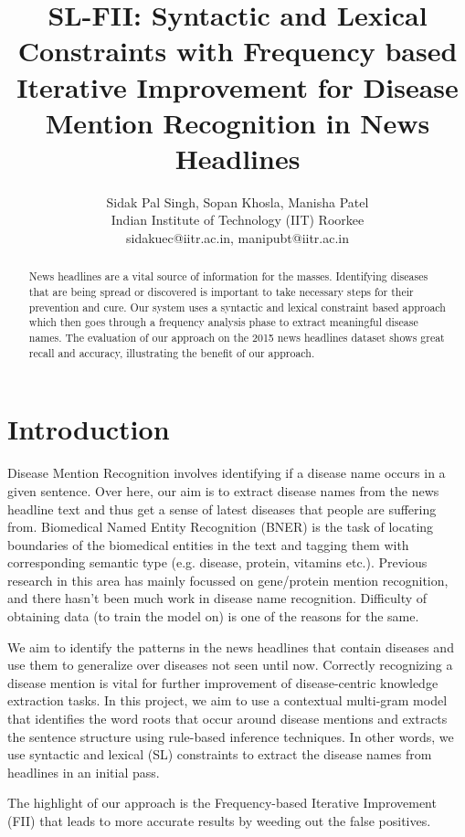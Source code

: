 \documentclass{article}
\title{SL-FII: Syntactic and Lexical Constraints with Frequency based Iterative Improvement for Disease Mention Recognition in News Headlines}
\author{Sidak Pal Singh, Sopan Khosla, Manisha Patel \\ 
Indian Institute of Technology (IIT) Roorkee  \\
sidakuec@iitr.ac.in, manipubt@iitr.ac.in}
\begin{document}
\maketitle

\begin{abstract}
  News headlines are a vital source of information for the masses. Identifying diseases that are being spread or discovered is important to take necessary steps for their prevention and cure. Our system uses a syntactic and lexical constraint based approach which then goes through a frequency analysis phase to extract meaningful disease names. The evaluation of our approach on the 2015 news headlines dataset shows great recall and accuracy, illustrating the benefit of our approach. 
\end{abstract}

\section{Introduction}

Disease Mention Recognition involves identifying if a disease name occurs in a given
sentence. Over here, our aim is to extract disease names from the news headline text
and thus get a sense of latest diseases that people are suffering from. Biomedical Named
Entity Recognition (BNER) is the task of locating boundaries of the biomedical entities in
the text and tagging them with corresponding semantic type (e.g. disease, protein,
vitamins etc.). Previous research in this area has mainly focussed on gene/protein
mention recognition, and there hasn’t been much work in disease name recognition.
Difficulty of obtaining data (to train the model on) is one of the reasons for the same.

We aim to identify the patterns in the news headlines that contain diseases and use them
to generalize over diseases not seen until now. Correctly recognizing a disease mention is vital for further improvement of disease-centric knowledge extraction tasks. In this
project, we aim to use a contextual multi-gram model that identifies the word roots that
occur around disease mentions and extracts the sentence structure using rule-based
inference techniques. In other words, we use syntactic and lexical (SL) constraints to extract the disease names from headlines in an initial pass.  

The highlight of our approach is the ​Frequency-based Iterative Improvement (FII) that leads to more accurate results by weeding out the false positives.
\end{document}
